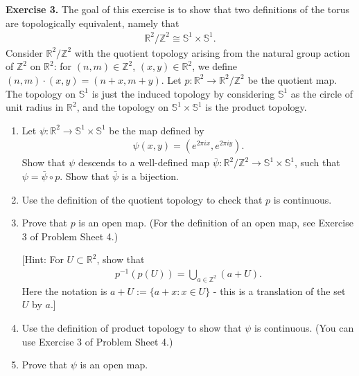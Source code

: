 \documentclass[12pt]{article}
\begin{document}
\noindent\textbf{Exercise 3.}
The goal of this exercise is to show that two definitions of the torus are topologically equivalent, namely that
\begin{align*}
\mathbb{R}^2/\mathbb{Z}^2 \cong \mathbb{S}^1 \times \mathbb{S}^1.
\end{align*}
Consider $\mathbb{R}^2/\mathbb{Z}^2$ with the quotient topology arising from the natural group action of $\mathbb{Z}^2$ on $\mathbb{R}^2$: for $(n,m) \in \mathbb{Z}^2$, $(x,y) \in \mathbb{R}^2$, we define $(n,m)\cdot(x,y) = (n+x,m+y)$. Let $p : \mathbb{R}^2 \to \mathbb{R}^2/\mathbb{Z}^2$ be the quotient map. The topology on $\mathbb{S}^1$ is just the induced topology by considering $\mathbb{S}^1$ as the circle of unit radius in $\mathbb{R}^2$, and the topology on $\mathbb{S}^1 \times \mathbb{S}^1$ is the product topology.
\begin{enumerate}
\setlength{\itemsep}{2pt}
\item[(i)] Let $\psi : \mathbb{R}^2 \to \mathbb{S}^1 \times \mathbb{S}^1$ be the map defined by
\begin{align*}
\psi(x,y) = \left(e^{2\pi ix},e^{2\pi iy}\right).
\end{align*}
Show that $\psi$ descends to a well-defined map $\bar{\psi} : \mathbb{R}^2/\mathbb{Z}^2 \to \mathbb{S}^1 \times \mathbb{S}^1$, such that $\psi = \bar{\psi} \circ p$. Show that $\bar{\psi}$ is a bijection.
\begin{center}
\end{center}
\item[(ii)] Use the definition of the quotient topology to check that $p$ is continuous.
\item[(iii)] Prove that $p$ is an open map. (For the definition of an open map, see Exercise 3 of Problem Sheet 4.)

[Hint: For $U \subset \mathbb{R}^2$, show that
\begin{align*}
p^{-1}(p(U)) = \bigcup_{a \in \mathbb{Z}^2}(a+U).
\end{align*}
Here the notation is $a+U := \{a+x : x \in U\}$ - this is a translation of the set $U$ by $a$.]
\item[(iv)] Use the definition of product topology to show that $\psi$ is continuous. (You can use Exercise 3 of Problem Sheet 4.)
\item[(v)] Prove that $\psi$ is an open map.


\end{enumerate}
\end{document}
